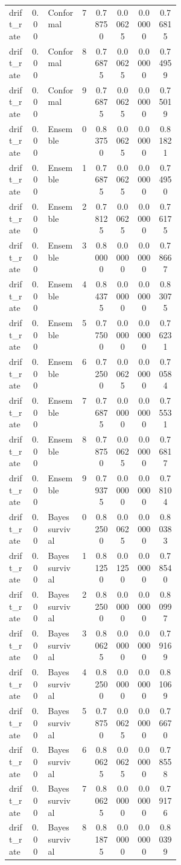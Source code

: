 \documentclass{article}
\begin{document}
\begin{center}
\begin{longtable}{p{0.13\linewidth}cp{0.20\linewidth}ccccc}
drift\_rate & 0.00 & Conformal & 7 & 0.78750 & 0.00625 & 0.00000 & 0.76815\\
drift\_rate & 0.00 & Conformal & 8 & 0.76875 & 0.00625 & 0.00000 & 0.74959\\
drift\_rate & 0.00 & Conformal & 9 & 0.76875 & 0.00625 & 0.00000 & 0.75019\\
drift\_rate & 0.00 & Ensemble & 0 & 0.83750 & 0.00625 & 0.00000 & 0.81821\\
drift\_rate & 0.00 & Ensemble & 1 & 0.76875 & 0.00625 & 0.00000 & 0.74950\\
drift\_rate & 0.00 & Ensemble & 2 & 0.78125 & 0.00625 & 0.00000 & 0.76175\\
drift\_rate & 0.00 & Ensemble & 3 & 0.80000 & 0.00000 & 0.00000 & 0.78667\\
drift\_rate & 0.00 & Ensemble & 4 & 0.84375 & 0.00000 & 0.00000 & 0.83075\\
drift\_rate & 0.00 & Ensemble & 5 & 0.77500 & 0.00000 & 0.00000 & 0.76231\\
drift\_rate & 0.00 & Ensemble & 6 & 0.72500 & 0.00625 & 0.00000 & 0.70584\\
drift\_rate & 0.00 & Ensemble & 7 & 0.76875 & 0.00000 & 0.00000 & 0.75531\\
drift\_rate & 0.00 & Ensemble & 8 & 0.78750 & 0.00625 & 0.00000 & 0.76817\\
drift\_rate & 0.00 & Ensemble & 9 & 0.79375 & 0.00000 & 0.00000 & 0.78104\\
drift\_rate & 0.00 & Bayes survival & 0 & 0.82500 & 0.00625 & 0.00000 & 0.80383\\
drift\_rate & 0.00 & Bayes survival & 1 & 0.81250 & 0.01250 & 0.00000 & 0.78540\\
drift\_rate & 0.00 & Bayes survival & 2 & 0.82500 & 0.00000 & 0.00000 & 0.80997\\
drift\_rate & 0.00 & Bayes survival & 3 & 0.80625 & 0.00000 & 0.00000 & 0.79169\\
drift\_rate & 0.00 & Bayes survival & 4 & 0.82500 & 0.00000 & 0.00000 & 0.81069\\
drift\_rate & 0.00 & Bayes survival & 5 & 0.78750 & 0.00625 & 0.00000 & 0.76670\\
drift\_rate & 0.00 & Bayes survival & 6 & 0.80625 & 0.00625 & 0.00000 & 0.78558\\
drift\_rate & 0.00 & Bayes survival & 7 & 0.80625 & 0.00000 & 0.00000 & 0.79176\\
drift\_rate & 0.00 & Bayes survival & 8 & 0.81875 & 0.00000 & 0.00000 & 0.80399\\

\end{longtable}
\end{center}
\end{document}

